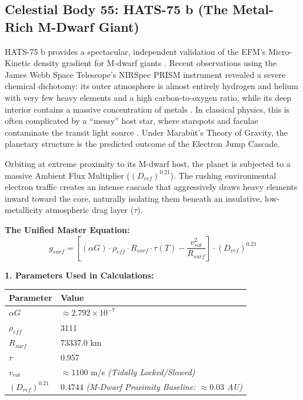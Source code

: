 \documentclass[11pt, a4paper]{article}
\begin{document}
\clearpage
\subsection{Celestial Body 55: HATS-75 b (The Metal-Rich M-Dwarf Giant)}
  HATS-75 b provides a spectacular, independent validation of the EFM's Micro-Kinetic density gradient for M-dwarf giants \cite{lustigyaeger2026}. Recent observations using the James Webb Space Telescope's NIRSpec PRISM instrument revealed a severe chemical dichotomy: its outer atmosphere is almost entirely hydrogen and helium with very few heavy elements and a high carbon-to-oxygen ratio, while its deep interior contains a massive concentration of metals \cite{lustigyaeger2026}. In classical physics, this is often complicated by a ``messy'' host star, where starspots and faculae contaminate the transit light source \cite{lustigyaeger2026}. Under Marab\={u}t's Theory of Gravity, the planetary structure is the predicted outcome of the Electron Jump Cascade.

  Orbiting at extreme proximity to its M-dwarf host, the planet is subjected to a massive Ambient Flux Multiplier ($(D_{ref})^{0.21}$). The rushing environmental electron traffic creates an intense cascade that aggressively draws heavy elements inward toward the core, naturally isolating them beneath an insulative, low-metallicity atmospheric drag layer ($\tau$).

  \vspace{0.5em}
  \noindent \textbf{The Unified Master Equation:}
  $$ g_{surf} = \left[ (\alpha G) \cdot \rho_{eff} \cdot R_{surf} \cdot \tau(T) - \frac{v_{rot}^2}{R_{surf}} \right] \cdot (D_{ref})^{0.21} $$

  \vspace{0.5em}
  \noindent \textbf{1. Parameters Used in Calculations:} \\[0.5em]
  \begingroup
  \renewcommand{\arraystretch}{1.3}
  \hspace*{2em}
  \begin{tabular}{|l|l|}
    \hline
    \textbf{Parameter} & \textbf{Value} \\ \hline
    $\alpha G$ & $\approx 2.792 \times 10^{-7}$ \\ \hline
    $\rho_{eff}$ & 3111 \\ \hline
    $R_{surf}$ & 73337.0 km \\ \hline
    $\tau$ & 0.957 \\ \hline
    $v_{rot}$ & $\approx 1100$ m/s \textit{(Tidally Locked/Slowed)} \\ \hline
    $(D_{ref})^{0.21}$ & $0.4744$ \textit{(M-Dwarf Proximity Baseline: $\approx 0.03$ AU)} \\ \hline
  \end{tabular}
  \endgroup
\end{document}
